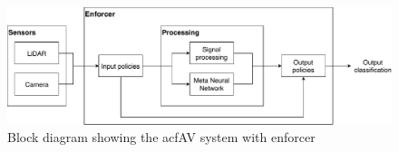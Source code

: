 \begin{figure}[t]
	\centering
	\includegraphics[scale=0.6]{Content/fig/SSNN.pdf}
	\caption{Block diagram showing the acf{AV} system with enforcer}
	\label{fig:ssnn}
\end{figure}






















